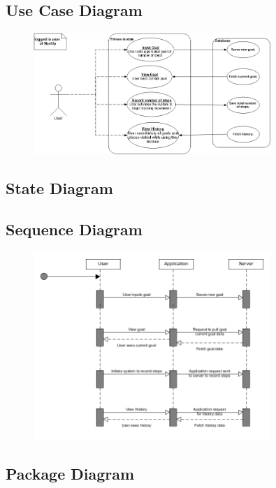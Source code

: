 \subsection{Use Case Diagram}
\begin{figure}[!htbp]
  \includegraphics[width=0.8\textwidth]{Fitness/FitnessUseCase.png}
\end{figure}

\subsection{State Diagram}

\subsection{Sequence Diagram}
\begin{figure}[!htbp]
  \includegraphics[width=0.8\textwidth]{Fitness/FitnessSequenceDgm.png}
\end{figure}


\subsection{Package Diagram}

